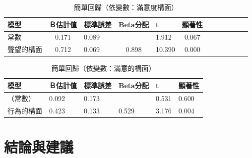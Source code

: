 
\begin{table}[htb]
\caption{簡單回歸（依變數：滿意度構面）}
\label{tab:H5}
\renewcommand{\arraystretch}{1.2} %
\arrayrulewidth=1pt               %
\tabcolsep=10pt                   %
\begin{tabular}[t]{lclclclclclc|}  %
\hline
 模型&Ｂ估計值&標準誤差&Beta分配&t&顯著性\\
\hline
常數&0.171&0.089&&1.912&0.067 \\
聲望的構面 & 0.712 & 0.069 & 0.898 & 10.390 & 0.000 \\
\hline
\end{tabular}
\end{table}

\begin{table}[htb]
\caption{簡單回歸（依變數：滿意的構面）}
\label{tab:H6}
\renewcommand{\arraystretch}{1.2} %
\arrayrulewidth=1pt               %
\tabcolsep=10pt                   %
\begin{tabular}[t]{llllll}  %
\hline
 模型&Ｂ估計值&標準誤差&Beta分配&t&顯著性\\
\hline
（常數）&0.092&0.173& &0.531&0.600\\
行為的構面&0.423&0.133&0.529&3.176&0.004\\
\hline
\end{tabular}
\end{table}


\chapter{結論與建議}

